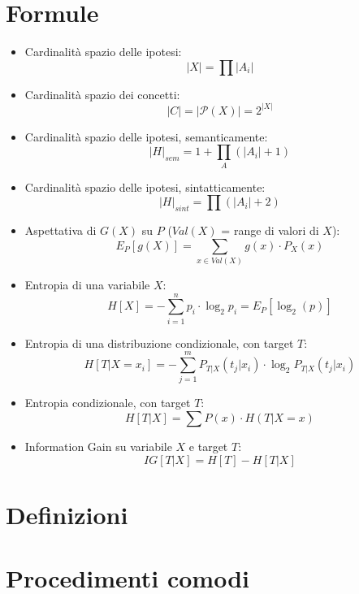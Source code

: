 \documentclass[a4paper,12pt, oneside]{article}
\title{}
\author{}
\date{}
\begin{document}

\newtheorem{teorema}{Teorema}
\newtheorem{definizione}{Definizione}
\newtheorem{esempio}{Esempio}
\newtheorem{corollario}{Corollario}
\newtheorem{lemma}{Lemma}
\newtheorem{osservazione}{Osservazione}
\newtheorem{nota}{Nota}
\newtheorem{esercizio}{Esercizio}

\renewcommand{\chaptermark}[1]{%
  \markboth{\chaptername
    \ \thechapter.\ #1}{}}
\renewcommand{\sectionmark}[1]{\markright{\thesection.\ #1}}
\allsectionsfont{\centering}
\section*{Formule}
\begin{itemize}
  \item Cardinalità spazio delle ipotesi:
  \[|X|=\prod |A_i|\]
  \item Cardinalità spazio dei concetti:
  \[|C|=|\mathcal{P}(X)|=2^{|X|}\]
  \item Cardinalità spazio delle ipotesi, semanticamente:
  \[|H|_{sem}=1+\prod_{A} (|A_i|+1)\]
  \item Cardinalità spazio delle ipotesi, sintatticamente:
  \[|H|_{sint}=\prod (|A_i|+2)\]
  \item Aspettativa di $G(X)$ su $P$ ($Val(X)$ = range di valori di $X$):
  \[E_P[g(X)]=\sum_{x\in Val(X)} g(x)\cdot P_X(x)\]
  \item Entropia di una variabile $X$:
  \[H[X]=-\sum_{i=1}^n p_i\cdot\log_2 p_i=E_P[\log_2(p)]\]
  \item Entropia di una distribuzione condizionale, con target $T$:
  \[H[T|X=x_i]=-\sum_{j=1}^m P_{T|X}(t_j|x_i)\cdot \log_2 P_{T|X}(t_j|x_i)\]
  \item Entropia condizionale, con target $T$:
  \[H[T|X]=\sum P(x)\cdot H(T|X=x)\]
  \item Information Gain su variabile $X$ e target $T$:
  \[IG[T|X]=H[T]-H[T|X]\]

\end{itemize}
\newpage
\section*{Definizioni}
\section*{Procedimenti comodi}
\end{document}
